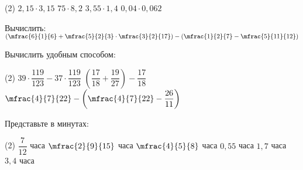 \begin{class}[number=7-8]
\begin{listofex}
		\begin{tasks}(2)
			\task \( 2,15\cdot3,15 \)
			\task \( 75\cdot8,2 \)
			\task \( 3,55\cdot1,4 \)
			\task \( 0,04\cdot0,062 \)
		\end{tasks}
		\item Вычислить: \( \left( \mfrac{6}{1}{6} + \mfrac{5}{2}{3} \cdot \mfrac{3}{2}{17} \right) - \left( \mfrac{1}{2}{7} - \mfrac{5}{11}{12} \right) \)
		\item Вычислить удобным способом:
		\begin{tasks}(2)
			\task \( 39 \cdot \dfrac{119}{123} - 37 \cdot \dfrac{119}{123} \)
			\task \( \left( \dfrac{17}{18} + \dfrac{19}{27} \right) - \dfrac{17}{18} \)
			\task \( \mfrac{4}{7}{22} - \left( \mfrac{4}{7}{22} - \dfrac{26}{11} \right) \)
		\end{tasks}
		\item Представьте в минутах:
		\begin{tasks}(2)
			\task \( \dfrac{7}{12} \) часа
			\task \( \mfrac{2}{9}{15} \) часа
			\task \( \mfrac{4}{5}{8} \) часа
			\task \( 0,55 \) часа
			\task \( 1,7 \) часа
			\task \( 3,4 \) часа
		\end{tasks}
	\end{listofex}
\end{class}

